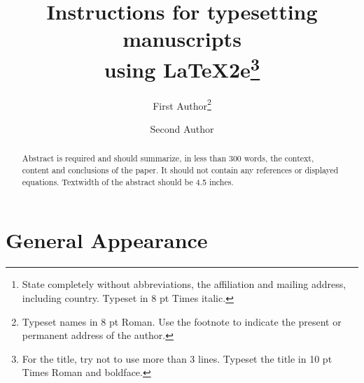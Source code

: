 \documentclass{ws-m3as}
\begin{document}

%
\catchline{}{}{}{}{}
%

\title{Instructions for typesetting manuscripts\\
using \LaTeX2e\footnote{For the title, try not to
use more than 3 lines. Typeset the title in 10 pt
Times Roman  and boldface.} }

\author{First Author\footnote{Typeset names in 8 pt Roman. Use the footnote to indicate the
present or permanent address of the author.}}

\address{University Department, University Name, Address\\
City, State ZIP/Zone,
Country\footnote{State completely without abbreviations, the
affiliation and mailing address, including country. Typeset in 8 pt
Times italic.}\\
first\_author@university.edu}

\author{Second Author}

\address{Group, Laboratory, Address\\
City, State ZIP/Zone, Country\\
second\_author@group.com}

\maketitle

\begin{history}
\end{history}

\begin{abstract}
Abstract is required and should summarize, in less
than 300 words, the context, content and conclusions of the
paper. It should not contain any references or displayed
equations.  Textwidth of the abstract should be 4.5 inches.
\end{abstract}



\section{General Appearance}	
\end{document}
